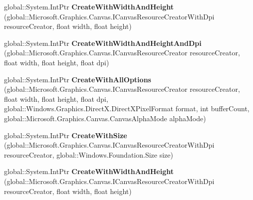 \begin{DoxyCompactItemize}
\item 
\mbox{\label{interface_microsoft_1_1_graphics_1_1_canvas_1_1_i_canvas_swap_chain_factory_a2adbd2e8ccc7fda2470b0e91e8d58ca7}} 
global\+::\+System.\+Int\+Ptr {\bfseries Create\+With\+Width\+And\+Height} (global\+::\+Microsoft.\+Graphics.\+Canvas.\+I\+Canvas\+Resource\+Creator\+With\+Dpi resource\+Creator, float width, float height)
\item 
\mbox{\label{interface_microsoft_1_1_graphics_1_1_canvas_1_1_i_canvas_swap_chain_factory_abec837948f196cc09791ba957885b690}} 
global\+::\+System.\+Int\+Ptr {\bfseries Create\+With\+Width\+And\+Height\+And\+Dpi} (global\+::\+Microsoft.\+Graphics.\+Canvas.\+I\+Canvas\+Resource\+Creator resource\+Creator, float width, float height, float dpi)
\item 
\mbox{\label{interface_microsoft_1_1_graphics_1_1_canvas_1_1_i_canvas_swap_chain_factory_ab3ef9c019b3b37be03ba50236075ba58}} 
global\+::\+System.\+Int\+Ptr {\bfseries Create\+With\+All\+Options} (global\+::\+Microsoft.\+Graphics.\+Canvas.\+I\+Canvas\+Resource\+Creator resource\+Creator, float width, float height, float dpi, global\+::\+Windows.\+Graphics.\+Direct\+X.\+Direct\+X\+Pixel\+Format format, int buffer\+Count, global\+::\+Microsoft.\+Graphics.\+Canvas.\+Canvas\+Alpha\+Mode alpha\+Mode)
\item 
\mbox{\label{interface_microsoft_1_1_graphics_1_1_canvas_1_1_i_canvas_swap_chain_factory_a80f024e2b5c57fefb1507afbe4bd54cc}} 
global\+::\+System.\+Int\+Ptr {\bfseries Create\+With\+Size} (global\+::\+Microsoft.\+Graphics.\+Canvas.\+I\+Canvas\+Resource\+Creator\+With\+Dpi resource\+Creator, global\+::\+Windows.\+Foundation.\+Size size)
\item 
\mbox{\label{interface_microsoft_1_1_graphics_1_1_canvas_1_1_i_canvas_swap_chain_factory_a2adbd2e8ccc7fda2470b0e91e8d58ca7}} 
global\+::\+System.\+Int\+Ptr {\bfseries Create\+With\+Width\+And\+Height} (global\+::\+Microsoft.\+Graphics.\+Canvas.\+I\+Canvas\+Resource\+Creator\+With\+Dpi resource\+Creator, float width, float height)

\end{DoxyCompactItemize}
